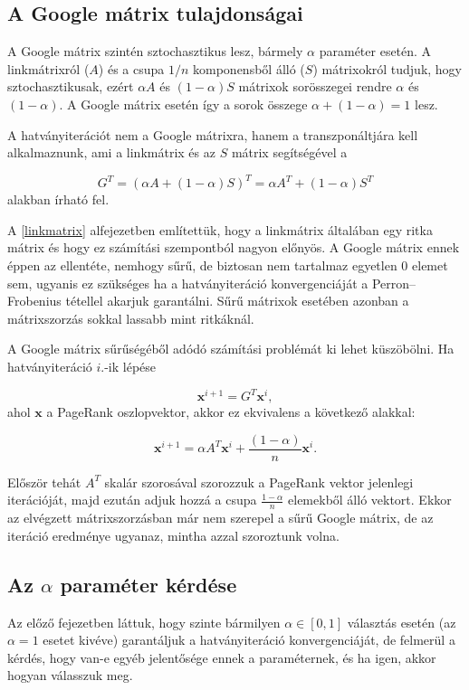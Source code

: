 \documentclass[12pt,a4paper]{article}
\newcommand{\bx}{\mathbf{x}}
\begin{document}
\subsection{A Google mátrix tulajdonságai}\label{google_matrix_tul}

A Google mátrix szintén sztochasztikus lesz, bármely $\alpha$ paraméter esetén. A linkmátrixról ($A$) és a csupa $1/n$ komponensből álló ($S$) mátrixokról tudjuk, hogy sztochasztikusak, ezért $\alpha A$ és $(1-\alpha)S$ mátrixok sorösszegei rendre $\alpha$ és $(1-\alpha)$. A Google mátrix esetén így a sorok összege $\alpha+(1-\alpha) = 1$ lesz.

A hatványiterációt nem a Google mátrixra, hanem a transzponáltjára kell alkalmaznunk, ami a linkmátrix és az $S$ mátrix segítségével a 

\[ G^T = (\alpha A + (1-\alpha)S)^T = \alpha A^T + (1-\alpha) S^T \]
alakban írható fel.

\vspace{0.2cm}

A \ref{linkmatrix} alfejezetben említettük, hogy a linkmátrix általában egy ritka mátrix és hogy ez számítási szempontból nagyon előnyös. A Google mátrix ennek éppen az ellentéte, nemhogy sűrű, de biztosan nem tartalmaz egyetlen 0 elemet sem, ugyanis ez szükséges ha a hatványiteráció konvergenciáját a Perron–Frobenius tétellel akarjuk garantálni. Sűrű mátrixok esetében azonban a mátrixszorzás sokkal lassabb mint ritkáknál.

A Google mátrix sűrűségéből adódó számítási problémát ki lehet küszöbölni. Ha hatványiteráció $i$.-ik lépése

\[ \bx^{i+1} = G^T \bx^i, \]
ahol $\bx$ a PageRank oszlopvektor, akkor ez ekvivalens a következő alakkal:

\[ \bx^{i+1} = \alpha A^T \bx^i + \frac{(1-\alpha)}{n} \bx^i. \] 

Először tehát $A^T$ skalár szorosával szorozzuk a PageRank vektor jelenlegi iterációját, majd ezután adjuk hozzá a csupa $\frac{1-\alpha}{n}$ elemekből álló vektort. Ekkor az elvégzett mátrixszorzásban már nem szerepel a sűrű Google mátrix, de az iteráció eredménye ugyanaz, mintha azzal szoroztunk volna. 

\subsection{Az $\alpha$ paraméter kérdése}

Az előző fejezetben láttuk, hogy szinte bármilyen $\alpha \in [0,1]$ választás esetén (az $\alpha=1$ esetet kivéve) garantáljuk a hatványiteráció konvergenciáját, de felmerül a kérdés, hogy van-e egyéb jelentősége ennek a paraméternek, és ha igen, akkor hogyan válasszuk meg.
\end{document}
